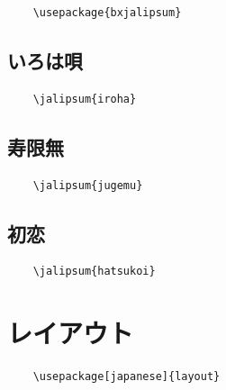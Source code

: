 \documentclass[
  article,
  head_space=25truemm,
  foot_space=10truemm,
gutter=15truemm]{jlreq}
\begin{document}
\begin{verbatim}
    \usepackage{bxjalipsum}
\end{verbatim}

\subsection{いろは唄}

\begin{verbatim}
    \jalipsum{iroha}
\end{verbatim}

\subsection{寿限無}

\begin{verbatim}
    \jalipsum{jugemu}
\end{verbatim}

\subsection{初恋}

\begin{verbatim}
    \jalipsum{hatsukoi}
\end{verbatim}

\section{レイアウト}

\begin{verbatim}
    \usepackage[japanese]{layout}
\end{verbatim}

\centering
\layout

\printbibliography[title={参考文献}]
\end{document}
